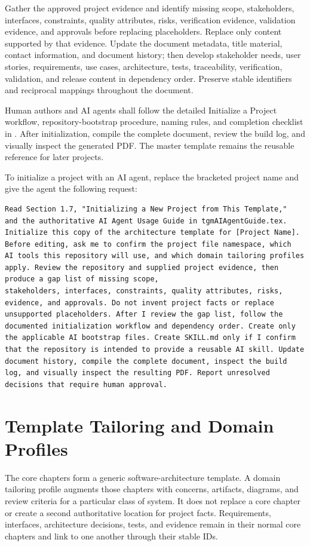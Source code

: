Gather the approved project evidence and identify missing scope, stakeholders,
interfaces, constraints, quality attributes, risks, verification evidence,
validation evidence, and approvals before replacing placeholders. Replace only
content supported by that evidence. Update the document metadata, title
material, contact information, and document history; then develop stakeholder
needs, user stories, requirements, use cases, architecture, tests,
traceability, verification, validation, and release content in dependency
order. Preserve stable identifiers and reciprocal mappings throughout the
document.

Human authors and AI agents shall follow the detailed Initialize a Project
workflow, repository-bootstrap procedure, naming rules, and completion
checklist in . After initialization, compile the
complete document, review the build log, and visually inspect the generated
PDF. The master template remains the reusable reference for later projects.

To initialize a project with an AI agent, replace the bracketed project name
and give the agent the following request:

\begin{verbatim}
Read Section 1.7, "Initializing a New Project from This Template,"
and the authoritative AI Agent Usage Guide in tgmAIAgentGuide.tex.
Initialize this copy of the architecture template for [Project Name].
Before editing, ask me to confirm the project file namespace, which
AI tools this repository will use, and which domain tailoring profiles
apply. Review the repository and supplied project evidence, then
produce a gap list of missing scope,
stakeholders, interfaces, constraints, quality attributes, risks,
evidence, and approvals. Do not invent project facts or replace
unsupported placeholders. After I review the gap list, follow the
documented initialization workflow and dependency order. Create only
the applicable AI bootstrap files. Create SKILL.md only if I confirm
that the repository is intended to provide a reusable AI skill. Update
document history, compile the complete document, inspect the build
log, and visually inspect the resulting PDF. Report unresolved
decisions that require human approval.
\end{verbatim}

\section{Template Tailoring and Domain Profiles}
\label{Section:DomainProfiles}
The core chapters form a generic software-architecture template. A domain
tailoring profile augments those chapters with concerns, artifacts, diagrams,
and review criteria for a particular class of system. It does not replace a
core chapter or create a second authoritative location for project facts.
Requirements, interfaces, architecture decisions, tests, and evidence remain
in their normal core chapters and link to one another through their stable IDs.

